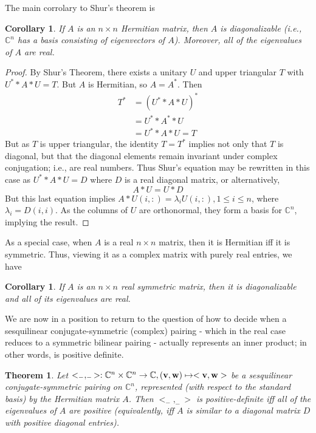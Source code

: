 \documentclass[11pt,notitlepage]{article}
\numberwithin{equation}{section}
\theoremstyle{plain}
\newtheorem{theorem}[equation]{Theorem}
\newtheorem{corollary}[equation]{Corollary}
\theoremstyle{definition}
\begin{document}
The main corrolary to Shur's theorem is 

\begin{corollary} If $A$ is an $n\times n$ Hermitian matrix, then $A$ is diagonalizable (i.e., $\mathbb C^n$ has a basis consisting of eigenvectors of $A$). Moreover, all of the eigenvalues of $A$ are real.
\end{corollary}

\begin{proof} By Shur's Theorem, there exists a unitary $U$ and upper triangular $T$ with $U^**A*U = T$. But $A$ is Hermitian, so $A = A^*$. Then
\begin{align*}
T^* &= \left(U^**A*U\right)^*\\
        &= U^**A^**U\\
        &= U^**A*U = T
\end{align*}
But as $T$ is upper triangular, the identity $T = T^*$ implies not only that $T$ is diagonal, but that the diagonal elements remain invariant under complex conjugation; i.e., are real numbers. Thus Shur's equation may be rewritten in this case as $U^**A*U = D$ where $D$ is a real diagonal matrix, or alternatively,
\[
A*U = U*D
\]
But this last equation implies $A*U(i,:) = \lambda_i U(i,:), 1\le i\le n$, where $\lambda_i = D(i,i)$. As the columns of $U$ are orthonormal, they form a basis for $\mathbb C^n$, implying the result.
\end{proof}

As a special case, when $A$ is a real $n\times n$ matrix, then it is Hermitian iff it is symmetric. Thus, viewing it as a complex matrix with purely real entries, we have

\begin{corollary} If $A$ is an $n\times n$ real symmetric matrix, then it is diagonalizable and all of its eigenvalues are real.
\end{corollary}

We are now in a position to return to the question of how to decide when a sesquilinear conjugate-symmetric (complex) pairing - which in the real case reduces to a symmetric bilinear pairing - actually represents an inner product; in other words, is positive definite.

\begin{theorem} Let $<_-,_->:\mathbb C^n\times\mathbb C^n\to \mathbb C, ({\bf v}, {\bf w})\mapsto <{\bf v}, {\bf w}>$ be a sesquilinear conjugate-symmetric pairing on $\mathbb C^n$, represented (with respect to the standard basis) by the Hermitian matrix $A$. Then $<_-,_->$ is positive-definite iff all of the eigenvalues of $A$ are positive (equivalently, iff $A$ is similar to a diagonal matrix $D$ with positive diagonal entries).
\end{theorem}
\end{document}
